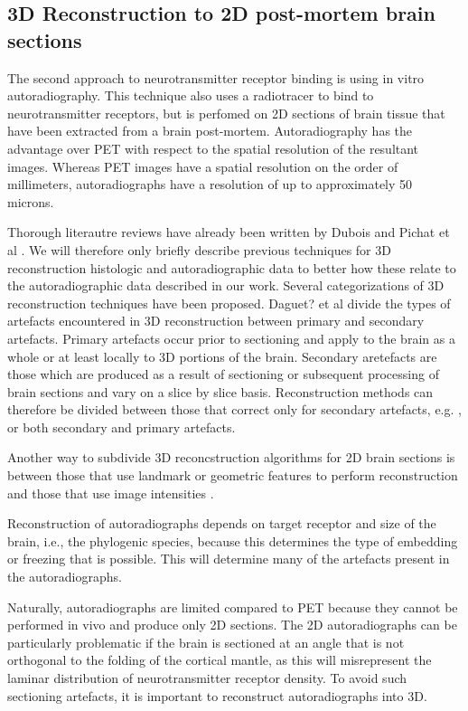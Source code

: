 \documentclass[12pt]{article}
\begin{document}
\subsection{3D Reconstruction to 2D post-mortem brain sections}
The second approach to neurotransmitter receptor binding is using in vitro autoradiography. This technique also uses a radiotracer to bind to neurotransmitter receptors, but is perfomed on 2D sections of brain tissue that have been extracted from a brain post-mortem. Autoradiography has the advantage over PET with respect to the spatial resolution of the resultant images. Whereas PET images have a spatial resolution on the order of millimeters, autoradiographs have a resolution of up to approximately 50 microns. 

Thorough literautre reviews have already been written by Dubois \cite{Dubois2007} and Pichat et al \cite{Pichat2018}. We will therefore only briefly describe previous techniques for 3D reconstruction histologic and autoradiographic data to better how these relate to the autoradiographic data described in our work. Several categorizations of 3D reconstruction techniques have been proposed. Daguet? et al \cite{CITATION} divide the types of artefacts encountered in 3D reconstruction between primary and secondary artefacts. Primary artefacts occur prior to sectioning and apply to the brain as a whole or at least locally to 3D portions of the brain. Secondary aretefacts are those which are produced as a result of sectioning or subsequent processing of brain sections and vary on a slice by slice basis. Reconstruction methods can therefore be divided between those that correct only for secondary artefacts, e.g. \cite{Charkarboty2006}, or both secondary and primary artefacts.

Another way to subdivide 3D reconcstruction algorithms for 2D brain sections is between those that use landmark or geometric features to perform reconstruction and those that use image intensities \cite{Pichat2018}.


Reconstruction of autoradiographs depends on target receptor and size of the brain, i.e., the phylogenic species, because this determines the type of embedding or freezing that is possible. This will determine many of the artefacts present in the autoradiographs.

Naturally, autoradiographs are limited compared to PET because they cannot be performed in vivo and produce only 2D sections. The 2D autoradiographs can be particularly problematic if the brain is sectioned at an angle that is not orthogonal to the folding of the cortical mantle, as this will misrepresent the laminar distribution of neurotransmitter receptor density. To avoid such sectioning artefacts, it is important to reconstruct autoradiographs into 3D. 
\end{document}
